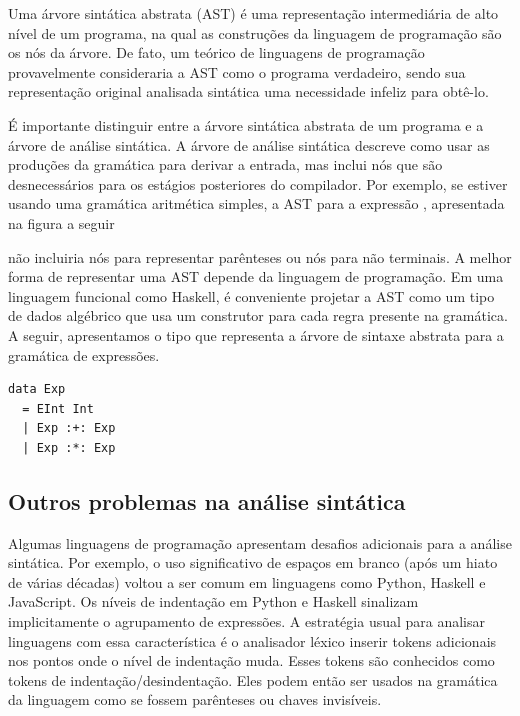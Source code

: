   Uma árvore sintática abstrata (AST) é uma representação intermediária
  de alto nível de um programa, na qual as construções da linguagem de
  programação são os nós da árvore. De fato, um teórico de linguagens
  de programação provavelmente consideraria a AST como o programa
  verdadeiro, sendo sua representação original analisada sintática uma
  necessidade infeliz para obtê-lo.

  É importante distinguir entre a árvore sintática abstrata de um
  programa e a árvore de análise sintática. A árvore de análise
  sintática descreve como usar as produções da gramática para derivar a
  entrada, mas inclui nós que são desnecessários para os estágios
  posteriores do compilador. Por exemplo, se estiver usando uma
  gramática aritmética simples, a AST para a expressão
  , apresentada na figura a seguir
  \begin{figure}[H]
    \centering
  \end{figure}

  não incluiria nós para representar parênteses ou nós para não
  terminais. A melhor forma de representar uma AST depende da linguagem
  de programação. Em uma linguagem funcional como Haskell, é
  conveniente projetar a AST como um tipo de dados algébrico que usa um
  construtor para cada regra presente na gramática. A seguir,
  apresentamos o tipo  que representa a
  árvore de sintaxe abstrata para a gramática de expressões.

\begin{verbatim}
data Exp
  = EInt Int
  | Exp :+: Exp
  | Exp :*: Exp
\end{verbatim}

  \subsection{Outros problemas na análise sintática}

  Algumas linguagens de programação apresentam desafios adicionais para
  a análise sintática. Por exemplo, o uso significativo de espaços em
  branco (após um hiato de várias décadas) voltou a ser comum em
  linguagens como Python, Haskell e JavaScript. Os níveis de indentação
  em Python e Haskell sinalizam implicitamente o agrupamento de
  expressões. A estratégia usual para analisar linguagens com essa
  característica é o analisador léxico inserir tokens adicionais nos
  pontos onde o nível de indentação muda. Esses tokens são conhecidos
  como tokens de indentação/desindentação. Eles podem então ser usados
  na gramática da linguagem como se fossem
  parênteses ou chaves invisíveis.

